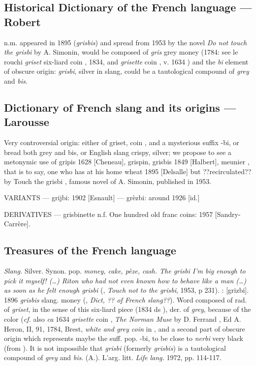 \subsection*{Historical Dictionary of the French language --- Robert}

n.m. appeared in 1895 (\emph{grisbis}) and spread from 1953 by the novel
\emph{Do not touch the grisbi} by A. Simonin, would be composed of \emph{gris}
\og grey money \fg{} (1784: see le rouchi \emph{griset} \og six-liard coin \fg{}, 1834, and \emph{grisette} \og coin \fg{}, v. 1634 ) and the \emph{bi} element of obscure origin: \emph{grisbi}, \og silver \fg{} in slang, could be a tautological compound of \emph{grey} and \emph{bis}.

\subsection*{Dictionary of French slang and its origins --- Larousse}

Very controversial origin: either of griset, \og coin \fg, and a
mysterious suffix -bi, or bread both grey and bis, or English slang
crispy, silver; we propose to see a metonymic use of gripis 1628
[Cheneau], grispin, grisbis 1849 [Halbert], \og meunier \fg{}, that is to say, \og one who has at his home wheat \fg{} 1895 [Delsalle] but ??recirculated?? by \og Touch the grisbi \fg{}, famous novel of A. Simonin, published in 1953.

VARIANTS --- grijbi: 1902 [Esnault] --- grèzbi: around 1926 [id.]

DERIVATIVES --- grisbinette n.f. One hundred old franc coins: 1957 [Sandry-Carrère].

\subsection*{Treasures of the French language}

\emph{Slang.} Silver. Synon. pop. \emph{money, cake, pèze, cash. The grisbi I'm big enough to pick it myself! (\ldots) Riton who had not even known how to behave like a man (\ldots) as soon as he felt enough grisbi} (, \emph{Touch not to the grisbi}, 1953, p 231).
: [grizbi].  1896 \emph{grisbis}
slang. \og money \fg{} (, \emph{Dict, ?? of French slang??}). Word composed of rad. of \emph{griset}, in the sense of this six-liard piece \fg{} (1834 ds ), der. of \emph{grey}, because of the color (\emph{cf.} also \emph{ca} 1634 \emph{grisette} \og coin \fg{}, \emph{The Norman Muse} by D. Ferrand , Ed A. Heron, II, 91, 1784, Brest, \emph{white and grey coin} in , and a second part of obscure origin which represents maybe the suff. pop. -bi, to be close to \emph{nerbi} \og very black \fg{} (from ). It is not impossible that \emph{grisbi} (formerly \emph{grisbis}) is a tautological compound of \emph{grey} and \emph{bis}.
  (A.). L'arg. litt. \emph{Life lang.} 1972, pp. 114-117.

